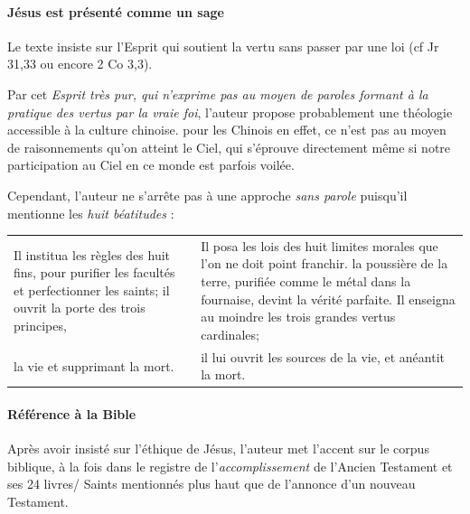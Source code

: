 \paragraph{Jésus est présenté comme un sage} Le texte insiste sur l'Esprit qui soutient la vertu sans passer par une loi (cf Jr 31,33   ou encore 2 Co 3,3).

Par cet  \textit{Esprit très pur, qui n'exprime pas au moyen de paroles formant à la pratique des vertus par la vraie foi}, l'auteur propose probablement une théologie accessible à la culture chinoise. pour les Chinois en effet,  ce n'est pas au moyen de raisonnements qu'on atteint le Ciel, qui s'éprouve directement
\cite[p. 117]{PolDroit:voyage} même si notre participation au Ciel en ce monde est parfois voilée.


Cependant, l'auteur ne s'arrête pas à une approche \textit{sans parole} puisqu'il mentionne les \textit{huit béatitudes} : 

\begin{tabular}{p{5.5cm}p{5.5cm}}
\\
Il institua les règles des huit fins, pour purifier les facultés et perfectionner les saints; il ouvrit la porte des trois principes,& Il posa les lois des huit limites morales que l'on ne doit point franchir. la poussière de la terre, purifiée comme le métal dans la fournaise, devint la vérité parfaite. Il enseigna au moindre les trois grandes vertus cardinales; 
\\ 
 [en ouvrant les portes] la vie et supprimant la mort. & il lui ouvrit les sources de la vie, et anéantit la mort.
\end{tabular}


 \paragraph{Référence à la Bible} Après avoir insisté sur l'éthique de Jésus, l'auteur met l'accent sur le corpus biblique, à la fois dans le registre de l'\textit{accomplissement} de l'Ancien Testament et ses 24 livres/ Saints mentionnés plus haut  que de l'annonce d'un nouveau Testament. 

